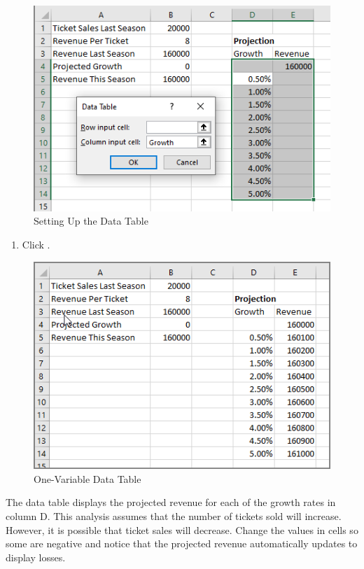 \begin{figure}[H]
	\centering
	\includegraphics[width=\maxwidth{.95\linewidth}]{gfx/ch08_fig18}
	\caption{Setting Up the Data Table}
	\label{08:fig18}
\end{figure}

\begin{enumerate}[resume]	
	\item Click .
\end{enumerate}

\begin{figure}[H]
	\centering
	\includegraphics[width=\maxwidth{.95\linewidth}]{gfx/ch08_fig19}
	\caption{One-Variable Data Table}
	\label{08:fig19}
\end{figure}

The data table displays the projected revenue for each of the growth rates in column D. This analysis assumes that the number of tickets sold will increase. However, it is possible that ticket sales will decrease. Change the values in cells  so some are negative and notice that the projected revenue automatically updates to display losses.

